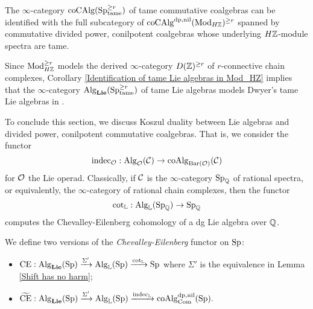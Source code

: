 \begin{corollary}
\label{Identification of tame commutative coalgebras in Mod_HZ}
    The $\infty$-category $\operatorname{coCAlg}(\operatorname{Sp}^{\geq r}_{\operatorname{\operatorname{tame}}})$ of tame commutative coalgebras can be identified with the full subcategory of $\operatorname{coCAlg}^{\operatorname{dp}, \operatorname{nil}}(\operatorname{Mod}_{H{\mathbb{Z}}})^{\geq r}$ spanned by commutative divided power, conilpotent coalgebras whose underlying $H{\mathbb{Z}}$-module spectra are tame.
\end{corollary}


\begin{remark}
\label{Identify tame Lie algebra with Dwyer's Lie algebra}
Since $\operatorname{Mod}_{H{\mathbb{Z}}}^{\geq r}$ models the derived $\infty$-category $D({\mathbb{Z}})^{\geq r}$ of $r$-connective chain complexes, Corollary \ref{Identification of tame Lie algebras in Mod_HZ} implies that the $\infty$-category $\operatorname{Alg}_{\mathbf{Lie}}(\operatorname{Sp}^{\geq r}_{\operatorname{\operatorname{tame}}})$ of tame Lie algebras models Dwyer's tame Lie algebras in \cite{Dwyer}.
\end{remark}











To conclude this section,
we discuss Koszul duality between Lie algebras and divided power, conilpotent commutative coalgebras.
That is, we consider the functor
$$\operatorname{indec}_{{\mathcal{O}}}: \operatorname{Alg}_{{\mathcal{O}}}({\mathcal{C}})\to \operatorname{coAlg}_{\operatorname{Bar}({\mathcal{O}})}({\mathcal{C}})$$
for ${\mathcal{O}}$ the Lie operad. 
Classically, if ${\mathcal{C}}$ is the $\infty$-category $\operatorname{Sp}_{{\mathbb{Q}}}$ of rational spectra, or equivalently, the $\infty$-category of rational chain complexes, then the functor 
$$
\cot_{{\mathbb{L}}}: \operatorname{Alg}_{{\mathbb{L}}}(\operatorname{Sp}_{{\mathbb{Q}}}) 
\to 
\operatorname{Sp}_{{\mathbb{Q}}}
$$
computes the Chevalley-Eilenberg cohomology of a dg Lie algebra over ${\mathbb{Q}}$. 

\begin{definition}
\label{CChevalley-Eilenberg functor}
  We define two versions of the \emph{Chevalley-Eilenberg} functor on $\operatorname{Sp}$:
    \begin{itemize}
        \item  
        $
        \operatorname{CE}: \operatorname{Alg}_{\mathbf{Lie}}(\operatorname{Sp})\xrightarrow{\Sigma'} \operatorname{Alg}_{{\mathbb{L}}}(\operatorname{Sp})
        \xrightarrow{\cot_{{\mathbb{L}}}}
        \operatorname{Sp}
        $
        where $\Sigma'$ is the equivalence in Lemma \ref{Shift has no harm};
        \item $
        \widetilde{\operatorname{CE}}: \operatorname{Alg}_{\mathbf{Lie}}(\operatorname{Sp})\xrightarrow{\Sigma'} \operatorname{Alg}_{{\mathbb{L}}}(\operatorname{Sp})
        \xrightarrow{\operatorname{indec}_{{\mathbb{L}}}}
        \operatorname{coAlg}^{\operatorname{dp}, \operatorname{nil}}_{\operatorname{Com}}(\operatorname{Sp}).
        $
    \end{itemize}
\end{definition}

